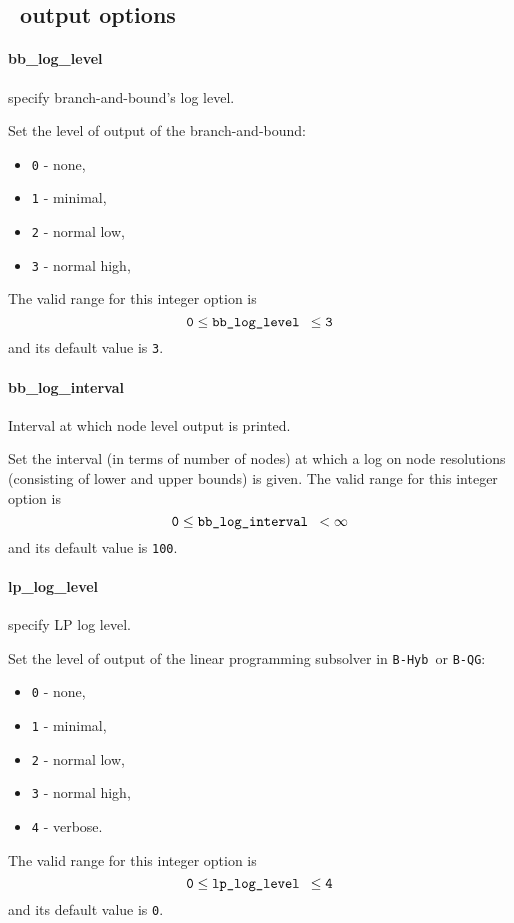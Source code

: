

\subsection{\Bonmin\  output options}
\label{app:opt_loglevel}
\paragraph{bb\_log\_level} specify branch-and-bound's log level.

 Set the level of output of the branch-and-bound:
 \begin{itemize}
  \item {\tt 0} - none,
  \item {\tt 1} - minimal,
  \item {\tt 2} - normal low,
  \item {\tt 3} - normal high,
  \end{itemize}
 The valid range for this integer option is
 $${\tt 0} \le \hbox{\tt bb\_log\_level } \le {\tt 3}$$
and its default value is {\tt 3}.


\paragraph{bb\_log\_interval} Interval at which node level output is printed.

 Set the interval (in terms of number of nodes) at
which a log on node resolutions (consisting of
lower and upper bounds) is given. The valid range for this integer option is
$${\tt 0} \le \hbox{\tt bb\_log\_interval } <  \infty$$
and its default value is {\tt 100}.


\paragraph{lp\_log\_level} specify LP log level.

 Set the level of output of the linear programming
subsolver in {\tt B-Hyb }or {\tt B-QG}:
 \begin{itemize}
  \item {\tt 0} - none,
  \item {\tt 1} - minimal,
  \item {\tt 2} - normal low,
  \item {\tt 3} - normal high,
  \item {\tt 4} - verbose.
  \end{itemize}
The valid range for this integer option is
$${\tt 0} \le \hbox{\tt lp\_log\_level } \le {\tt 4}$$
and its default value is {\tt 0}.


